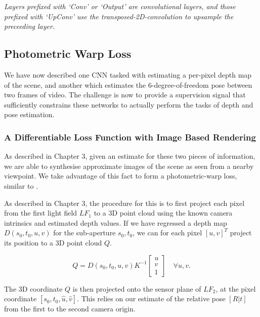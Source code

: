 \begin{table}[h]
    \vspace{4mm}{}
    \textit{Layers prefixed with `Conv' or `Output' are convolutional layers, and those prefixed with `UpConv' use the transposed-2D-convolution to upsample the preceeding layer.}
    
    \label{posenet-layers}
\end{table}


\subsection{Photometric Warp Loss}
We have now described one CNN tasked with estimating a per-pixel depth map of the scene, and another which estimates the 6-degree-of-freedom pose between two frames of video. The challenge is now to provide a supervision signal that sufficiently constrains these networks to actually perform the tasks of depth and pose estimation. 

\subsubsection{A Differentiable Loss Function with Image Based Rendering}

As described in Chapter 3, given an estimate for these two pieces of information, we are able to synthesise approximate images of the scene as seen from a nearby viewpoint. We take advantage of this fact to form a photometric-warp loss, similar to \cite{zhou2017unsupervised}. 

As described in Chapter 3, the procedure for this is to first project each pixel from the first light field $LF_1$ to a 3D point cloud using the known camera intrinsics and estimated depth values. If we have regressed a depth map $D(s_0, t_0, u, v)$ for the sub-aperture $s_0, t_0$, we can for each pixel $[u, v]^T$ project its position to a 3D point cloud $Q$. 

\begin{equation}
    Q = D(s_0, t_0, u, v) K^{-1}\begin{bmatrix}u \\ v \\ 1\end{bmatrix} \quad \forall u, v.
\end{equation}

The 3D coordinate $Q$ is then projected onto the sensor plane of $LF_2$, at the pixel coordinate $[s_0,t_0,\hat{u},\hat{v}]$. This relies on our estimate of the relative pose $[R|t]$ from the first to the second camera origin.

